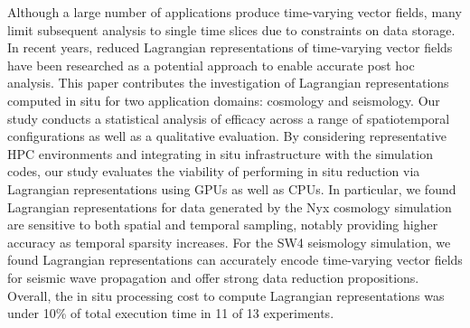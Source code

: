 Although a large number of applications produce time-varying vector fields, many limit subsequent analysis to single time slices due to constraints on data storage.
%
In recent years, reduced Lagrangian representations of time-varying vector fields have been researched as a potential approach to enable accurate post hoc analysis.
%
This paper contributes the investigation of Lagrangian representations computed in situ for two application domains: cosmology and seismology.
%
%
Our study conducts a statistical analysis of efficacy across a range of spatiotemporal configurations as well as a qualitative evaluation. %
%
By considering representative HPC environments and integrating in situ infrastructure with the simulation codes, our study evaluates the viability of performing in situ reduction via Lagrangian representations using GPUs as well as CPUs.
%
In particular, we found Lagrangian representations for data generated by the Nyx cosmology simulation are sensitive to both spatial and temporal sampling, notably providing higher accuracy as temporal sparsity increases.
%
For the SW4 seismology simulation, we found Lagrangian representations can accurately encode time-varying vector fields for seismic wave propagation and offer strong data reduction propositions.
%
%
Overall, the in situ processing cost to compute Lagrangian representations was under 10\% of total execution time in 11 of 13 experiments.
%
